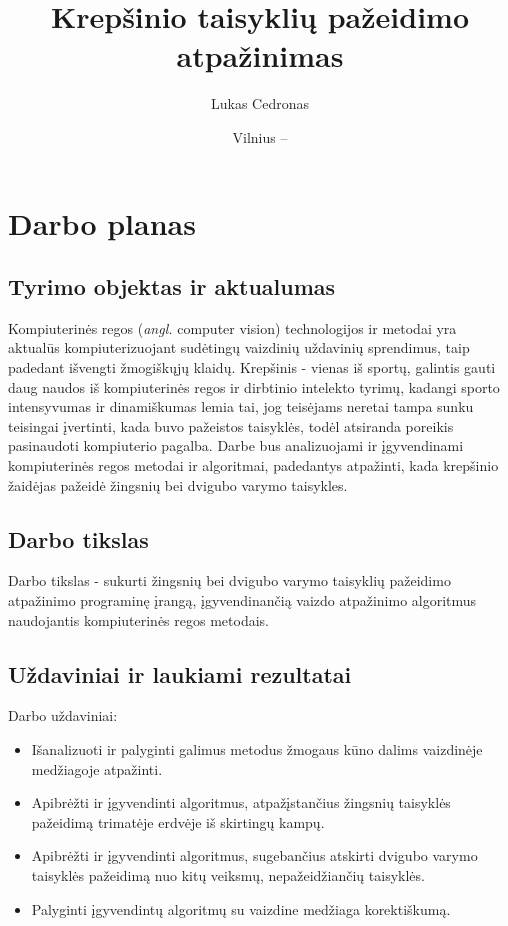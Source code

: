 \documentclass{VUMIFPSbakalaurinis}
\institute{Informatikos institutas}  %
\title{Krepšinio taisyklių pažeidimo atpažinimas}
\author{Lukas Cedronas}
\date{Vilnius – \the\year}
\begin{document}
\maketitle


\section{Darbo planas}

\subsection{Tyrimo objektas ir aktualumas}
Kompiuterinės regos (\textit{angl.} computer vision) technologijos ir metodai yra aktualūs kompiuterizuojant sudėtingų vaizdinių uždavinių sprendimus, taip padedant išvengti žmogiškųjų klaidų. Krepšinis - vienas iš sportų, galintis gauti daug naudos iš kompiuterinės regos ir dirbtinio intelekto tyrimų, kadangi sporto intensyvumas ir dinamiškumas lemia tai, jog teisėjams neretai tampa sunku teisingai įvertinti, kada buvo pažeistos taisyklės, todėl atsiranda poreikis pasinaudoti kompiuterio pagalba. Darbe bus analizuojami ir įgyvendinami kompiuterinės regos metodai ir algoritmai, padedantys atpažinti, kada krepšinio žaidėjas pažeidė žingsnių bei dvigubo varymo taisykles. 

\subsection{Darbo tikslas}
Darbo tikslas - sukurti žingsnių bei dvigubo varymo taisyklių pažeidimo atpažinimo programinę įrangą, įgyvendinančią vaizdo atpažinimo algoritmus naudojantis kompiuterinės regos metodais.

\subsection{Uždaviniai ir laukiami rezultatai}
Darbo uždaviniai:
\begin{itemize}[topsep=5pt,itemsep=-1ex,partopsep=2ex,parsep=2ex]
 \item Išanalizuoti ir palyginti galimus metodus žmogaus kūno dalims vaizdinėje medžiagoje atpažinti.
 \item Apibrėžti ir įgyvendinti algoritmus, atpažįstančius žingsnių taisyklės pažeidimą trimatėje erdvėje iš skirtingų kampų.
 \item Apibrėžti ir įgyvendinti algoritmus, sugebančius atskirti dvigubo varymo taisyklės pažeidimą nuo kitų veiksmų, nepažeidžiančių taisyklės.
 \item Palyginti įgyvendintų algoritmų su vaizdine medžiaga korektiškumą.
\end{itemize}
\end{document}

